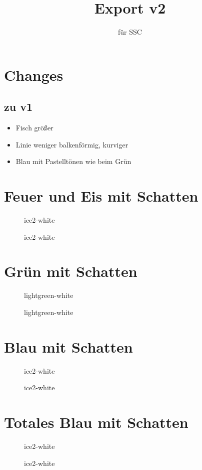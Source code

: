 \documentclass[a4paper]{article}
\title{Export v2}
\author{für SSC}
\begin{document}
\maketitle

\section{Changes}
\subsection{zu v1}
\begin{itemize}
  \item Fisch größer
  \item Linie weniger balkenförmig, kurviger
  \item Blau mit Pastelltönen wie beim Grün
\end{itemize}


\newcommand{\sty}[3]{%
\pagebreak%
\section*{#1}%
\begin{figure}[htb]%
    \centering%
    \begin{minipage}[t]{0.45\linewidth}%
        \centering%
        \def\svgwidth{\columnwidth}%
        \caption{#2}%
    \end{minipage}%
    \hfill%
    \begin{minipage}[t]{0.45\linewidth}%
        \centering%
        \def\svgwidth{\columnwidth}%
        \caption{#3}%
    \end{minipage}%
\end{figure}%
\begin{figure}[htb]%
    \centering%
    \begin{minipage}[t]{0.45\linewidth}%
        \centering%
        \def\svgwidth{\columnwidth}%
        \caption{#2}%
    \end{minipage}%
    \hfill%
    \begin{minipage}[t]{0.45\linewidth}%
        \centering%
        \def\svgwidth{\columnwidth}%
        \caption{#3}%
    \end{minipage}%
\end{figure}%
}



\sty{Feuer und Eis mit Schatten}{fire-black}{ice2-white}
\sty{Grün mit Schatten}{darkgreen-black}{lightgreen-white}
\sty{Blau mit Schatten}{ice2-black}{ice2-white}
\sty{Totales Blau mit Schatten}{dblue-blue}{ice2-white}
\end{document}
